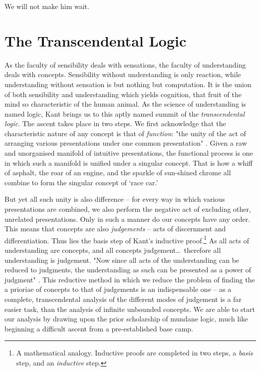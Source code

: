 \noindent
We will not make him wait.

\section*{The Transcendental Logic}
As the faculty of sensibility deals with sensations, the faculty of understanding deals with concepts. Sensibility without understanding is only reaction, while understanding without sensation is but nothing but computation. It is the union of both sensibility and understanding which yields cognition, that fruit of the mind so characteristic of the human animal. As the science of understanding is named logic, Kant brings us to this aptly named summit of the \emph{transcendental logic}. The ascent takes place in two steps. We first acknowledge that the characteristic nature of any concept is that of \emph{function}: "the unity of the act of arranging various presentations under one common presentation" \autocite[B93]{hackett}. Given a raw and unorganised manifold of intuitive presentations, the functional process is one in which such a manifold is unified under a singular concept. That is how a whiff of asphalt, the roar of an engine, and the sparkle of sun-shined chrome all combine to form the singular concept of `race car.'

But yet all such unity is also difference -- for every way in which various presentations are combined, we also perform the negative act of excluding other, unrelated presentations. Only in such a manner do our concepts have any order. This means that concepts are also \emph{judgements} -- acts of discernment and differentiation. Thus lies the basis step of Kant's inductive proof.\footnote{A mathematical analogy. Inductive proofs are completed in two steps, a \emph{basis} step, and an \emph{inductive} step.} As all acts of understanding are concepts, and all concepts judgement\ldots\ therefore all understanding is judgement. "Now since all acts of the understanding can be reduced to judgments, the understanding as such can be presented as a power of judgment" \autocite[B94]{hackett}. This reductive method in which we reduce the problem of finding the a prioriae of concepts to that of judgements is an indispensable one -- as a complete, transcendental analysis of the different modes of judgement is a far easier task, than the analysis of infinite unbounded concepts. We are able to start our analysis by drawing upon the prior scholarship of mundane logic, much like beginning a difficult ascent from a pre-established base camp.

